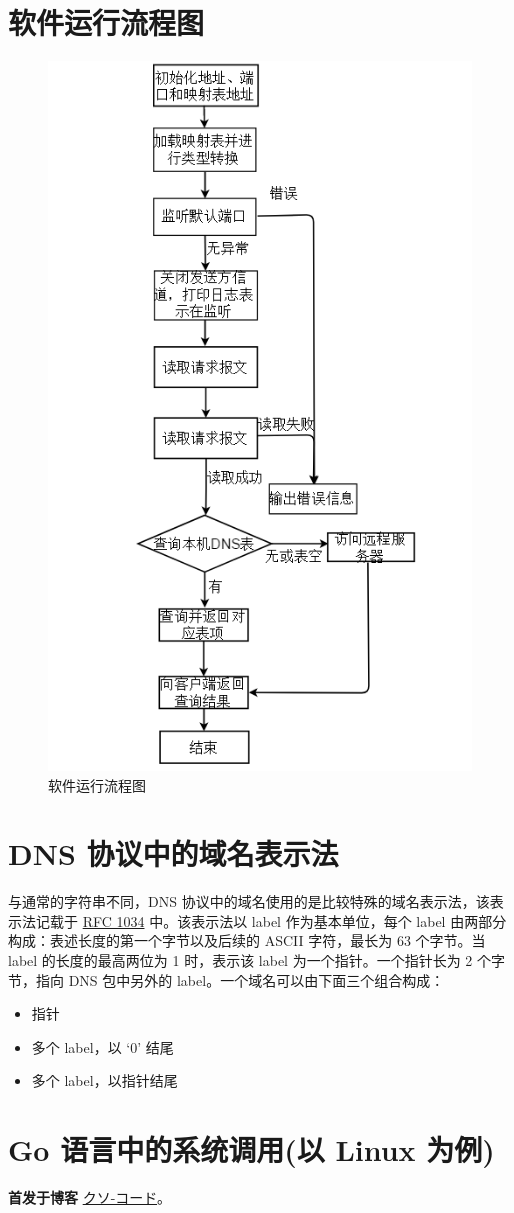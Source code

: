 \documentclass[blue,normal,cn]{elegantnote}
\begin{document}
\section{软件运行流程图}
\begin{figure}[!htbp]
	\centering
	\includegraphics[width=.5\textwidth]{flow.png}
	\caption{软件运行流程图}
	\label{flow}
\end{figure}

\section{DNS 协议中的域名表示法}
与通常的字符串不同，DNS 协议中的域名使用的是比较特殊的域名表示法，该表示法记载于 \href{https://tools.ietf.org/html/rfc1034}{RFC 1034} 中。该表示法以 label 作为基本单位，每个 label 由两部分构成：表述长度的第一个字节以及后续的 ASCII 字符，最长为 63 个字节。当 label 的长度的最高两位为 1 时，表示该 label 为一个指针。一个指针长为 2 个字节，指向 DNS 包中另外的 label。一个域名可以由下面三个组合构成：

\begin{itemize}
	\item 指针
	\item 多个 label，以 `0' 结尾
	\item 多个 label，以指针结尾
\end{itemize}

\section{Go 语言中的系统调用(以 Linux 为例)}
\textbf{首发于博客} \href{https://kuso-kodo.github.io/2019/03/04/go-syscall/}{クソ-コード}。
\end{document}
